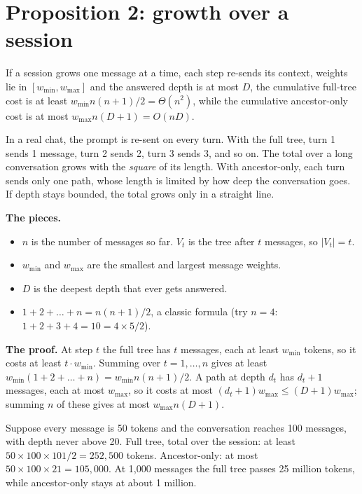 \section{Proposition 2: growth over a session}

\begin{paper}
If a session grows one message at a time, each step re-sends its context, weights lie in $[w_{\min},w_{\max}]$ and the answered depth is at most $D$, the cumulative full-tree cost is at least $w_{\min}n(n+1)/2=\Theta(n^2)$, while the cumulative ancestor-only cost is at most $w_{\max}n(D+1)=O(nD)$.
\end{paper}

\begin{plain}
In a real chat, the prompt is re-sent on every turn. With the full tree, turn 1 sends 1 message, turn 2 sends 2, turn 3 sends 3, and so on. The total over a long conversation grows with the \emph{square} of its length. With ancestor-only, each turn sends only one path, whose length is limited by how deep the conversation goes. If depth stays bounded, the total grows only in a straight line.
\end{plain}

\textbf{The pieces.}
\begin{itemize}
\item $n$ is the number of messages so far. $V_t$ is the tree after $t$ messages, so $|V_t| = t$.
\item $w_{\min}$ and $w_{\max}$ are the smallest and largest message weights.
\item $D$ is the deepest depth that ever gets answered.
\item $1 + 2 + \dots + n = n(n+1)/2$, a classic formula (try $n = 4$: $1+2+3+4 = 10 = 4 \times 5 / 2$).
\end{itemize}

\textbf{The proof.} At step $t$ the full tree has $t$ messages, each at least $w_{\min}$ tokens, so it costs at least $t \cdot w_{\min}$. Summing over $t = 1, \dots, n$ gives at least $w_{\min}(1 + 2 + \dots + n) = w_{\min} n(n+1)/2$. A path at depth $d_t$ has $d_t + 1$ messages, each at most $w_{\max}$, so it costs at most $(d_t + 1)w_{\max} \le (D+1)w_{\max}$; summing $n$ of these gives at most $w_{\max} n (D+1)$.

\begin{example}
Suppose every message is 50 tokens and the conversation reaches 100 messages, with depth never above 20. Full tree, total over the session: at least $50 \times 100 \times 101 / 2 = 252{,}500$ tokens. Ancestor-only: at most $50 \times 100 \times 21 = 105{,}000$. At 1,000 messages the full tree passes 25 million tokens, while ancestor-only stays at about 1 million.
\end{example}

